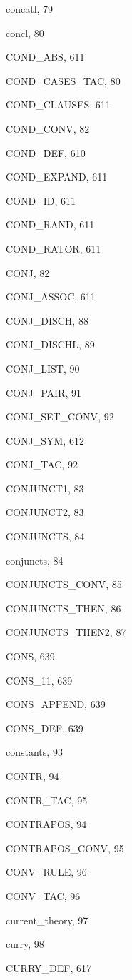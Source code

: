 \begin{theindex}
  \item {\ptt concatl}, 79
  \item {\ptt concl}, 80
  \item {\ptt COND\_ABS}, 611
  \item {\ptt COND\_CASES\_TAC}, 80
  \item {\ptt COND\_CLAUSES}, 611
  \item {\ptt COND\_CONV}, 82
  \item {\ptt COND\_DEF}, 610
  \item {\ptt COND\_EXPAND}, 611
  \item {\ptt COND\_ID}, 611
  \item {\ptt COND\_RAND}, 611
  \item {\ptt COND\_RATOR}, 611
  \item {\ptt CONJ}, 82
  \item {\ptt CONJ\_ASSOC}, 611
  \item {\ptt CONJ\_DISCH}, 88
  \item {\ptt CONJ\_DISCHL}, 89
  \item {\ptt CONJ\_LIST}, 90
  \item {\ptt CONJ\_PAIR}, 91
  \item {\ptt CONJ\_SET\_CONV}, 92
  \item {\ptt CONJ\_SYM}, 612
  \item {\ptt CONJ\_TAC}, 92
  \item {\ptt CONJUNCT1}, 83
  \item {\ptt CONJUNCT2}, 83
  \item {\ptt CONJUNCTS}, 84
  \item {\ptt conjuncts}, 84
  \item {\ptt CONJUNCTS\_CONV}, 85
  \item {\ptt CONJUNCTS\_THEN}, 86
  \item {\ptt CONJUNCTS\_THEN2}, 87
  \item {\ptt CONS}, 639
  \item {\ptt CONS\_11}, 639
  \item {\ptt CONS\_APPEND}, 639
  \item {\ptt CONS\_DEF}, 639
  \item {\ptt constants}, 93
  \item {\ptt CONTR}, 94
  \item {\ptt CONTR\_TAC}, 95
  \item {\ptt CONTRAPOS}, 94
  \item {\ptt CONTRAPOS\_CONV}, 95
  \item {\ptt CONV\_RULE}, 96
  \item {\ptt CONV\_TAC}, 96
  \item {\ptt current\_theory}, 97
  \item {\ptt curry}, 98
  \item {\ptt CURRY\_DEF}, 617


\end{theindex}
